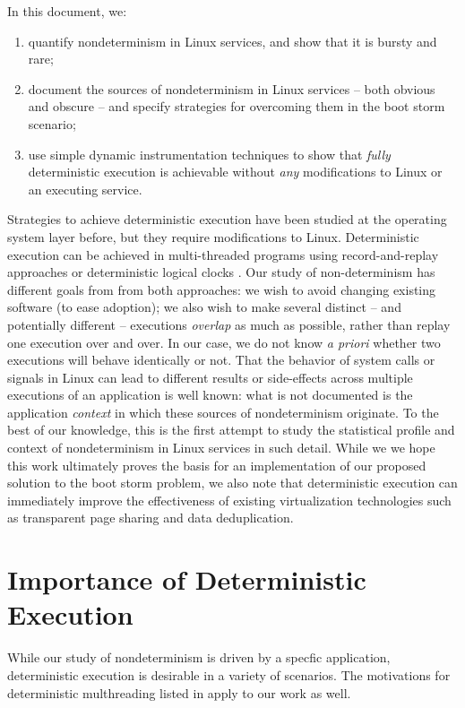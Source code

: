 In this document, we:
\begin {enumerate}
\item quantify nondeterminism in Linux services, and show that it is
  bursty and rare;
\item document the sources of nondeterminism in Linux services -- both obvious and obscure --
  and specify strategies for overcoming them in the boot storm scenario;
\item use simple dynamic instrumentation techniques to show that \emph{fully} deterministic execution is achievable
  without \emph{any} modifications to Linux or an executing service.
\end {enumerate}

Strategies to achieve deterministic execution have been studied at the operating system layer \cite{bergan2010dos} before,
but they require modifications to Linux. Deterministic execution can be achieved in multi-threaded programs 
using record-and-replay approaches \cite{patil2010pinplay} or deterministic logical clocks \cite{marek2011scaling}. 
Our study of non-determinism has different goals from from both approaches: we wish to avoid changing existing 
software (to ease adoption); we also wish to make several distinct -- and potentially different -- executions \emph{overlap} as much as possible, 
rather than replay one execution over and over. In our case, we do not know \emph{a priori} whether two executions 
will behave identically or not. That the behavior of system calls or signals in Linux can lead to different results or side-effects across
multiple executions of an application is well known: what is not documented is the application \emph{context} in
which these sources of nondeterminism originate. To the best of our knowledge, this is
the first attempt to study the statistical profile and context of nondeterminism in Linux services
in such detail. While we we hope
this work ultimately proves the basis for an implementation of our proposed solution to the boot storm
problem, we also note that deterministic execution can immediately improve
the effectiveness of existing virtualization technologies such as transparent page sharing
and data deduplication.

\section{Importance of Deterministic Execution}
While our study of nondeterminism is driven by a specfic application,
deterministic execution is desirable in a variety of scenarios.
The motivations for deterministic multhreading listed in
\cite{marek2011scaling, patil2010pinplay} apply to our work as well. \newline

